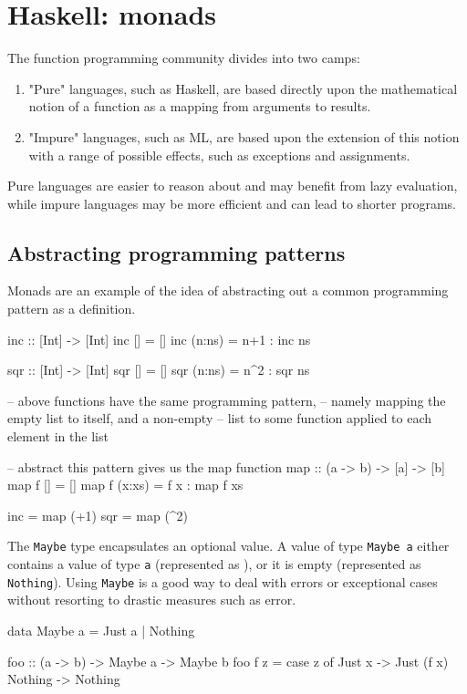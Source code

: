 \section{Haskell: monads}
The function programming community divides into two camps:
\begin{enumerate}
    \item "Pure" languages, such as Haskell, are based directly upon the 
    mathematical notion of a function as a mapping from arguments to 
    results.

    \item "Impure" languages, such as ML, are based upon the extension of this notion with a range of possible effects, such as exceptions and assignments.
\end{enumerate}
Pure languages are easier to reason about and may benefit from lazy
evaluation, while impure languages may be more efficient 
and can lead to shorter programs.

\subsection{Abstracting programming patterns}
Monads are an example of the idea of abstracting out a common 
programming pattern as a definition. 

\begin{haskellcode}
inc :: [Int] -> [Int]
inc []     =  []
inc (n:ns) =  n+1 : inc ns

sqr :: [Int] -> [Int]
sqr []     =  []
sqr (n:ns) =  n^2 : sqr ns

-- above functions have the same programming pattern, 
-- namely mapping the empty list to itself, and a non-empty 
-- list to some function applied to each element in the list

-- abstract this pattern gives us the map function
map         :: (a -> b) -> [a] -> [b]
map f []     = []
map f (x:xs) = f x : map f xs

inc = map (+1)
sqr = map (^2)
\end{haskellcode}

The \texttt{Maybe} type encapsulates an optional value.
A value of type \texttt{Maybe a} either 
contains a value of type \texttt{a} (represented as ), 
or it is empty 
(represented as \texttt{Nothing}). 
Using \texttt{Maybe} is a good way to deal with errors or 
exceptional cases without resorting to drastic measures such as error.


\begin{haskellcode}
data Maybe a = Just a | Nothing

foo :: (a -> b) -> Maybe a -> Maybe b
foo f z = case z of 
            Just x  -> Just (f x)
            Nothing -> Nothing 
\end{haskellcode}

